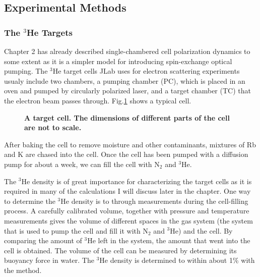 \subsection{Experimental Methods}

\subsubsection{The $^{3}$He Targets}

Chapter 2 has already described single-chambered cell polarization dynamics to some extent as it is a simpler model for introducing spin-exchange optical pumping. The $^{3}$He target cells JLab uses for electron scattering experiments usualy include two chambers, a pumping chamber (PC), which is placed in an oven and pumped by circularly polarized laser, and a target chamber (TC) that the electron beam passes through. Fig.\ref{TargetCell} shows a typical cell. 

\begin{figure}[H]
	\centering
	\caption{{\bf A target cell. The dimensions of different parts of the cell are not to scale.}}
	\label{TargetCell}
\end{figure}

After baking the cell to remove moisture and other contaminants, mixtures of Rb and K are chased into the cell. Once the cell has been pumped with a diffusion pump for about a week, we can fill the cell with N$_{2}$ and $^{3}$He. 

The $^{3}$He density is of great importance for characterizing the target cells as it is required in many of the calculations I will discuss later in the chapter. One way to determine the $^{3}$He density is to through measurements during the cell-filling process. A carefully calibrated volume, together with pressure and temperature measurements gives the volume of different spaces in the gas system (the system that is used to pump the cell and fill it with N$_{2}$ and $^{3}$He) and the cell. By comparing the amount of $^{3}$He left in the system, the amount that went into the cell is obtained. The volume of the cell can be measured by determining its buoyancy force in water. The $^{3}$He density is determined to within about 1\% with the method.

